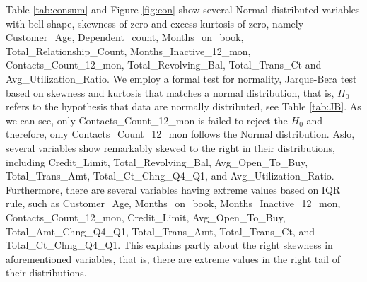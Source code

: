 Table \ref{tab:consum} and Figure \ref{fig:con} show several
Normal-distributed variables with bell shape, skewness of zero and
excess kurtosis of zero, namely Customer\_Age, Dependent\_count,
Months\_on\_book, Total\_Relationship\_Count, Months\_Inactive\_12\_mon,
Contacts\_Count\_12\_mon, Total\_Revolving\_Bal, Total\_Trans\_Ct and
Avg\_Utilization\_Ratio. We employ a formal test for normality,
Jarque-Bera test based on skewness and kurtosis that matches a normal
distribution, that is, \(H_0\) refers to the hypothesis that data are
normally distributed, see Table \ref{tab:JB}. As we can see, only
Contacts\_Count\_12\_mon is failed to reject the \(H_0\) and therefore,
only Contacts\_Count\_12\_mon follows the Normal distribution. Aslo,
several variables show remarkably skewed to the right in their
distributions, including Credit\_Limit, Total\_Revolving\_Bal,
Avg\_Open\_To\_Buy, Total\_Trans\_Amt, Total\_Ct\_Chng\_Q4\_Q1, and
Avg\_Utilization\_Ratio. Furthermore, there are several variables having
extreme values based on IQR rule, such as Customer\_Age,
Months\_on\_book, Months\_Inactive\_12\_mon, Contacts\_Count\_12\_mon,
Credit\_Limit, Avg\_Open\_To\_Buy, Total\_Amt\_Chng\_Q4\_Q1,
Total\_Trans\_Amt, Total\_Trans\_Ct, and Total\_Ct\_Chng\_Q4\_Q1. This
explains partly about the right skewness in aforementioned variables,
that is, there are extreme values in the right tail of their
distributions.

